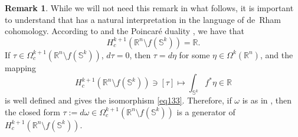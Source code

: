 \documentclass[intlimits,12pt,reqno]{amsart}
\newcommand{\Sph}{\mathbb S}
\newcommand{\R}{\mathbb R}
\numberwithin{equation}{section}
\theoremstyle{definition}
\newtheorem{remark}[theorem]{Remark}
\begin{document}
\begin{remark}
\label{R13}
While we will not need this remark in what follows, it is important to understand that  has a natural interpretation in the language of de~Rham cohomology. According to \cite[Corollary 1.29]{Vick} and the Poincar\'e duality \cite[Theorem~3.35]{Hatcher}, we have that
\begin{equation}
\label{eq133}
H_c^{k+1}(\R^n\setminus f(\Sph^k))=\R.
\end{equation}
If $\tau\in\Omega_c^{k+1}(\R^n\setminus f(\Sph^k))$, $d\tau=0$, then $\tau=d\eta$ for some $\eta\in \Omega^k(\R^n)$, and the mapping
$$
H_c^{k+1}(\R^n\setminus f(\Sph^k))\ni [\tau]\mapsto\int_{\Sph^k}f^*\eta\in\R
$$
is well defined and gives the isomorphism \eqref{eq133}. Therefore, if $\omega$ is as in , then the closed form $\tau:=d\omega\in\Omega_c^{k+1}(\R^n\setminus f(\Sph^k))$ is a generator of $H_c^{k+1}(\R^n\setminus f(\Sph^k))$. 
\end{remark}
\end{document}
